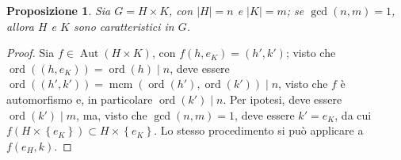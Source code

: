 \documentclass[12pt]{scrartcl}
\theoremstyle{style}
\newtheorem{prop}{Proposizione}[section]
\numberwithin{equation}{subsection}
\begin{document}
\begin{prop}
	Sia $G = H\times K$, con $\lvert H \rvert = n$ e $\lvert K \rvert = m$; se $\operatorname{gcd}(n,m) =1$, allora $H$ e $K$ sono caratteristici in $G$.
\end{prop}
	\begin{proof}
		Sia $f \in \operatorname{Aut} (H \times K)$, con $f(h,e_K) = (h',k')$; visto che $\operatorname{ord}((h,e_K)) = \operatorname{ord}(h)  \mid n$, deve essere $\operatorname{ord}((h',k')) = \operatorname{mcm} (\operatorname{ord}(h') ,\operatorname{ord}(k') )  \mid n$, visto che $f$ \`e automorfismo e, in particolare $\operatorname{ord}(k')  \mid n$.
		Per ipotesi, deve essere $\operatorname{ord}(k')  \mid m $, ma, visto che $\operatorname{gcd}(n,m) =1 $, deve essere $k' = e_K$, da cui $f(H \times \left\{ e_K \right\} ) \subset H \times \left\{ e_K \right\} $.
		Lo stesso procedimento si pu\`o applicare a $f(e_H, k)$.
	\end{proof}
\end{document}
